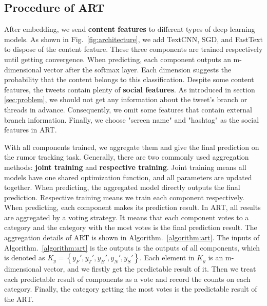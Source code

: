 \subsection{Procedure of ART}
After embedding, we send \textbf{content features} to different types of deep learning models. As shown in Fig.~\ref{fig:architecture}, we add TextCNN, SGD, and FastText to dispose of the content feature. These three components are trained respectively until getting convergence. When predicting, each component outputs an m-dimensional vector after the softmax layer. Each dimension suggests the probability that the content belongs to this classification. Despite some content features, the tweets contain plenty of \textbf{social features}. As introduced in section \ref{sec:problem}, we should not get any information about the tweet's branch or threads in advance. Consequently, we omit some features that contain external branch information. Finally, we choose "screen name" and "hashtag" as the social features in ART. 

With all components trained, we aggregate them and give the final prediction on the rumor tracking task. Generally, there are two commonly used aggregation methods: \textbf{joint training} and \textbf{respective training}. Joint training means all models have one shared optimization function, and all parameters are updated together. When predicting, the aggregated model directly outputs the final prediction. Respective training means we train each component respectively. When predicting, each component makes its prediction result. In ART, all results are aggregated by a voting strategy. It means that each component votes to a category and the category with the most votes is the final prediction result. The aggregation details of ART is shown in Algorithm.~\ref{algorithm:art}. The inputs of Algorithm.~\ref{algorithm:art} is the outputs is the outputs of all components, which is denoted as $K_y = \left\{y_F', y_T', y_B', y_N', y_S' \right\}$. Each element in $K_y$ is an m-dimensional vector, and we firstly get the predictable result of it. Then we treat each predictable result of components as a vote and record the counts on each category. Finally, the category getting the most votes is the predictable result of the ART. 
